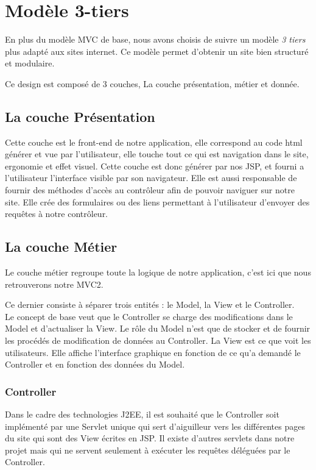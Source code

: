 \section{Modèle 3-tiers}
En plus du modèle MVC de base, nous avons choisis de suivre un modèle \emph{3 tiers} plus adapté aux sites internet.
Ce modèle permet d'obtenir un site bien structuré et modulaire.

Ce design est composé de 3 couches,
La couche présentation, métier et donnée.

\subsection{La couche Présentation}
Cette couche est le front-end de notre application, elle correspond au code html générer et vue par l'utilisateur, elle touche tout ce qui est navigation dans le site, ergonomie et effet visuel.
Cette couche est donc générer par nos JSP, et fourni a l'utilisateur l'interface visible par son navigateur.
Elle est aussi responsable de fournir des méthodes d'accès au contrôleur afin de pouvoir naviguer sur notre site.
Elle crée des formulaires ou des liens permettant à l'utilisateur d'envoyer des requêtes à notre contrôleur.

\subsection{La couche Métier}
Le couche métier regroupe toute la logique de notre application, c'est ici que nous retrouverons notre MVC2.

Ce dernier consiste à séparer trois 
entités : le Model, la View et le Controller. \\

Le concept de base veut que le Controller se charge des modifications dans le 
Model et d'actualiser la View.
Le rôle du Model n'est que de stocker et de
fournir les procédés de modification de données au Controller. La View est ce que voit les utilisateurs.
Elle affiche l'interface graphique en fonction de ce 
qu'a demandé le Controller et en fonction des données du Model. \\


\subsubsection{Controller}
Dans le cadre des technologies J2EE, il est souhaité que le Controller soit implémenté par une Servlet unique qui sert d'aiguilleur vers les différentes 
pages du site qui sont des View écrites en JSP. Il existe d'autres servlets 
dans notre projet mais qui ne servent seulement à exécuter les requêtes déléguées par le Controller.\\

